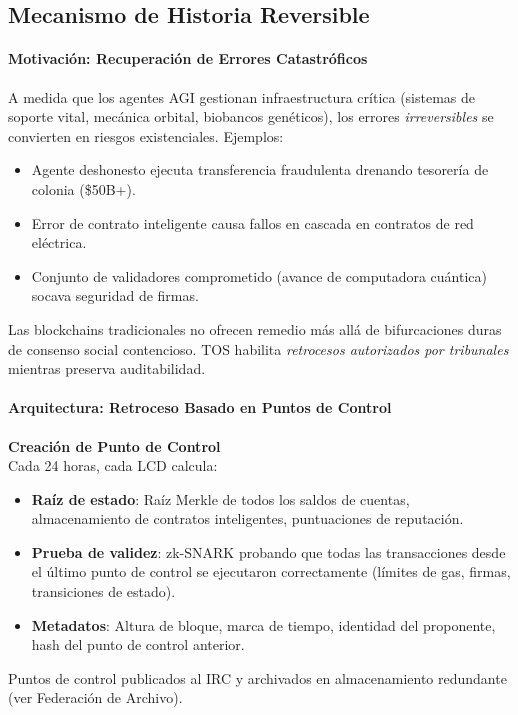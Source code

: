 \documentclass[11pt]{article}
\begin{document}
\subsection{Mecanismo de Historia Reversible}

\paragraph{Motivación: Recuperación de Errores Catastróficos}
A medida que los agentes AGI gestionan infraestructura crítica (sistemas de soporte vital, mecánica orbital, biobancos genéticos), los errores \emph{irreversibles} se convierten en riesgos existenciales. Ejemplos:
\begin{itemize}[noitemsep]
  \item Agente deshonesto ejecuta transferencia fraudulenta drenando tesorería de colonia (\$50B+).
  \item Error de contrato inteligente causa fallos en cascada en contratos de red eléctrica.
  \item Conjunto de validadores comprometido (avance de computadora cuántica) socava seguridad de firmas.
\end{itemize}
Las blockchains tradicionales no ofrecen remedio más allá de bifurcaciones duras de consenso social contencioso. TOS habilita \emph{retrocesos autorizados por tribunales} mientras preserva auditabilidad.

\paragraph{Arquitectura: Retroceso Basado en Puntos de Control}
\textbf{Creación de Punto de Control}\\
Cada 24 horas, cada LCD calcula:
\begin{itemize}[noitemsep]
  \item \textbf{Raíz de estado}: Raíz Merkle de todos los saldos de cuentas, almacenamiento de contratos inteligentes, puntuaciones de reputación.
  \item \textbf{Prueba de validez}: zk-SNARK probando que todas las transacciones desde el último punto de control se ejecutaron correctamente (límites de gas, firmas, transiciones de estado).
  \item \textbf{Metadatos}: Altura de bloque, marca de tiempo, identidad del proponente, hash del punto de control anterior.
\end{itemize}
Puntos de control publicados al IRC y archivados en almacenamiento redundante (ver Federación de Archivo).
\end{document}
